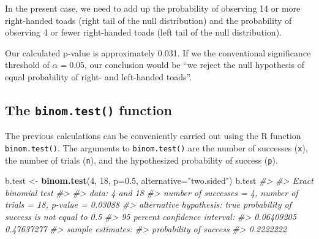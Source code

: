 \documentclass[]{book}
\newenvironment{Shaded}{\begin{snugshade}}{\end{snugshade}}
\newcommand{\CommentTok}[1]{\textcolor[rgb]{0.56,0.35,0.01}{\textit{#1}}}
\newcommand{\DataTypeTok}[1]{\textcolor[rgb]{0.13,0.29,0.53}{#1}}
\newcommand{\DecValTok}[1]{\textcolor[rgb]{0.00,0.00,0.81}{#1}}
\newcommand{\FloatTok}[1]{\textcolor[rgb]{0.00,0.00,0.81}{#1}}
\newcommand{\KeywordTok}[1]{\textcolor[rgb]{0.13,0.29,0.53}{\textbf{#1}}}
\newcommand{\NormalTok}[1]{#1}
\newcommand{\OperatorTok}[1]{\textcolor[rgb]{0.81,0.36,0.00}{\textbf{#1}}}
\newcommand{\StringTok}[1]{\textcolor[rgb]{0.31,0.60,0.02}{#1}}
\theoremstyle{definition}
\theoremstyle{definition}
\theoremstyle{definition}
\theoremstyle{remark}
\begin{document}
In the present case, we need to add up the probability of observing 14
or more right-handed toads (right tail of the null distribution) and the
probability of observing 4 or fewer right-handed toads (left tail of the
null distribution).

\begin{Shaded}
\end{Shaded}

Our calculated p-value is approximately 0.031. If we the conventional
significance threshold of \(\alpha = 0.05\), our conclusion would be
``we reject the null hypothesis of equal probability of right- and
left-handed toads''.

\hypertarget{the-binom.test-function}{%
\subsection{\texorpdfstring{The \texttt{binom.test()}
function}{The binom.test() function}}\label{the-binom.test-function}}

The previous calculations can be conveniently carried out using the R
function \texttt{binom.test()}. The arguments to \texttt{binom.test()}
are the number of successes (\texttt{x}), the number of trials
(\texttt{n}), and the hypothesized probability of success (\texttt{p}).

\begin{Shaded}
\begin{Highlighting}[]
\NormalTok{b.test <-}\StringTok{ }\KeywordTok{binom.test}\NormalTok{(}\DecValTok{4}\NormalTok{, }\DecValTok{18}\NormalTok{, }\DataTypeTok{p=}\FloatTok{0.5}\NormalTok{, }\DataTypeTok{alternative=}\StringTok{"two.sided"}\NormalTok{)}
\NormalTok{b.test}
\CommentTok{#> }
\CommentTok{#>  Exact binomial test}
\CommentTok{#> }
\CommentTok{#> data:  4 and 18}
\CommentTok{#> number of successes = 4, number of trials = 18, p-value = 0.03088}
\CommentTok{#> alternative hypothesis: true probability of success is not equal to 0.5}
\CommentTok{#> 95 percent confidence interval:}
\CommentTok{#>  0.06409205 0.47637277}
\CommentTok{#> sample estimates:}
\CommentTok{#> probability of success }
\CommentTok{#>              0.2222222}
\end{Highlighting}
\end{Shaded}
\end{document}
